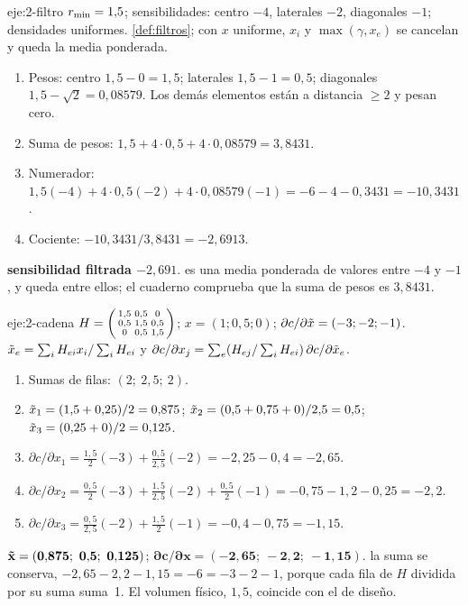 \begin{solucion}{eje:2-filtro}
\datos $r_{\min}=1{,}5$; sensibilidades: centro $-4$, laterales $-2$, diagonales $-1$; densidades uniformes.
\planteamiento \cref{def:filtros}; con $x$ uniforme, $x_i$ y $\max(\gamma,x_e)$ se cancelan y queda la media ponderada.
\pasos
\begin{enumerate}[label=\arabic*.]
  \item Pesos: centro $1{,}5-0=1{,}5$; laterales $1{,}5-1=0{,}5$; diagonales $1{,}5-\sqrt2=0{,}08579$. Los demás elementos están a distancia $\ge 2$ y pesan cero.
  \item Suma de pesos: $1{,}5+4\cdot 0{,}5+4\cdot 0{,}08579=3{,}8431$.
  \item Numerador: $1{,}5(-4)+4\cdot 0{,}5(-2)+4\cdot 0{,}08579(-1)=-6-4-0{,}3431=-10{,}3431$.
  \item Cociente: $-10{,}3431/3{,}8431=-2{,}6913$.
\end{enumerate}
\resultado \textbf{sensibilidad filtrada $-2{,}691$}.
\comprobacion es una media ponderada de valores entre $-4$ y $-1$, y queda entre ellos; el cuaderno comprueba que la suma de pesos es $3{,}8431$.
\end{solucion}

\begin{solucion}{eje:2-cadena}
\datos $H=\begin{psmallmatrix}1{,}5&0{,}5&0\\0{,}5&1{,}5&0{,}5\\0&0{,}5&1{,}5\end{psmallmatrix}$; $x=(1;0{,}5;0)$; $\partial c/\partial\tilde{x}=(-3;-2;-1)$.
\planteamiento $\tilde{x}_e=\sum_iH_{ei}x_i/\sum_iH_{ei}$ y $\partial c/\partial x_j=\sum_e(H_{ej}/\sum_iH_{ei})\,\partial c/\partial\tilde{x}_e$.
\pasos
\begin{enumerate}[label=\arabic*.]
  \item Sumas de filas: $(2;\ 2{,}5;\ 2)$.
  \item $\tilde{x}_1=(1{,}5+0{,}25)/2=0{,}875$; $\tilde{x}_2=(0{,}5+0{,}75+0)/2{,}5=0{,}5$; $\tilde{x}_3=(0{,}25+0)/2=0{,}125$.
  \item $\partial c/\partial x_1=\tfrac{1{,}5}{2}(-3)+\tfrac{0{,}5}{2{,}5}(-2)=-2{,}25-0{,}4=-2{,}65$.
  \item $\partial c/\partial x_2=\tfrac{0{,}5}{2}(-3)+\tfrac{1{,}5}{2{,}5}(-2)+\tfrac{0{,}5}{2}(-1)=-0{,}75-1{,}2-0{,}25=-2{,}2$.
  \item $\partial c/\partial x_3=\tfrac{0{,}5}{2{,}5}(-2)+\tfrac{1{,}5}{2}(-1)=-0{,}4-0{,}75=-1{,}15$.
\end{enumerate}
\resultado $\mathbf{\xf=(0{,}875;\ 0{,}5;\ 0{,}125)}$; $\mathbf{\partial c/\partial x=(-2{,}65;\ -2{,}2;\ -1{,}15)}$.
\comprobacion la suma se conserva, $-2{,}65-2{,}2-1{,}15=-6=-3-2-1$, porque cada fila de $H$ dividida por su suma suma~1. El volumen físico, $1{,}5$, coincide con el de diseño.
\end{solucion}

